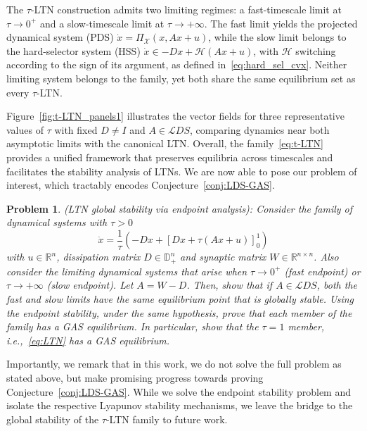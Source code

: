 \documentclass[letterpaper, conference]{ieeeconf}
\newcommand{\R}{\mathbb R}
\newcommand{\X}{\mathcal X}
\newtheorem{problem}{Problem}
\newcommand{\longthmtitle}[1]{\mbox{}{\textit{(#1):}}}
\newcommand{\1}{\mathbf{1}}
\newcommand{\mc}{\mathcal}
\begin{document}
The \(\tau\)-LTN construction admits two limiting regimes: a fast-timescale limit at $\tau\to 0^+$ and a slow-timescale limit at $\tau\to+\infty$. The fast limit yields the projected dynamical system (PDS) $\dot{x}=\Pi_{\X}(x, Ax+u)$, while the slow limit belongs to the hard-selector system (HSS) $\dot{x}\in-Dx+\mc H(Ax+u)$, with \(\mc H\) switching according to the sign of its argument, as defined in~\eqref{eq:hard_sel_cvx}. 
Neither limiting system belongs to the family, yet both share the same equilibrium set as every $\tau$-LTN. 

Figure~\ref{fig:t-LTN_panels1} illustrates the vector fields for three representative values of $\tau$ with fixed $D\neq I$ and $A\in\mc LDS$, comparing dynamics near both asymptotic limits with the canonical LTN. 
Overall, the family~\eqref{eq:t-LTN} provides a unified framework that preserves equilibria across timescales and facilitates the stability analysis of LTNs. We are now able to pose our problem of interest, which tractably encodes Conjecture~\ref{conj:LDS-GAS}.

\begin{problem}\longthmtitle{LTN global stability via endpoint analysis}
    Consider the family of dynamical systems with \(\tau > 0\)
    \[\dot x = \frac1\tau\left(-Dx+[Dx+\tau(Ax+u)]_0^1\right)\]
    with \(u \in \R^n\), dissipation matrix \(D \in \mathbb D_+^n\) and synaptic matrix \(W \in \R^{n\times n}\).
    Also consider the limiting dynamical systems that arise when \(\tau \to 0^+\) (fast endpoint) or \(\tau \to +\infty\) (slow endpoint).
    Let \(A = W-D\).
    Then, show that if \(A \in \mc LDS\), both the fast and slow limits have the same equilibrium point that is globally stable. 
    Using the endpoint stability, under the same hypothesis, prove that each member of the family has a GAS equilibrium.
    In particular, show that the \(\tau = 1\) member, i.e.,~\eqref{eq:LTN} has a GAS equilibrium.
\end{problem}

Importantly, we remark that in this work, we do not solve the full problem as stated above, but make promising progress towards proving Conjecture~\ref{conj:LDS-GAS}. While we solve the endpoint stability problem and isolate the respective Lyapunov stability mechanisms, we leave the bridge to the global stability of the \(\tau\)-LTN family to future work.
\end{document}
